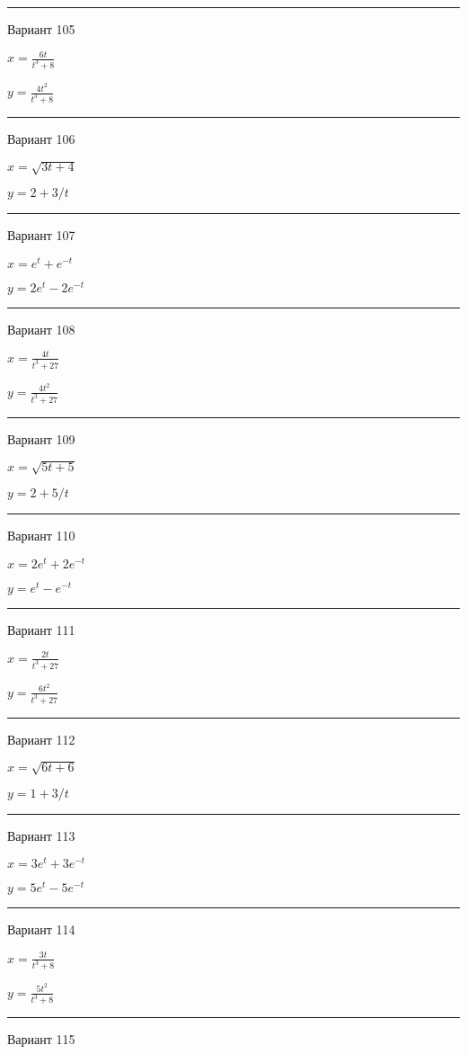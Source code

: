 \documentclass[11pt]{report}
\begin{document}
\rule{\textwidth}{.2mm}

 Вариант 105

$x = \frac{6 t}{t^{3} + 8}$

$y = \frac{4 t^{2}}{t^{3} + 8}$

\rule{\textwidth}{.2mm}

 Вариант 106

$x = \sqrt{3 t + 4}$

$y = 2 + 3 / t$

\rule{\textwidth}{.2mm}

 Вариант 107

$x = e^{t} + e^{- t}$

$y = 2 e^{t} - 2 e^{- t}$

\rule{\textwidth}{.2mm}

 Вариант 108

$x = \frac{4 t}{t^{3} + 27}$

$y = \frac{4 t^{2}}{t^{3} + 27}$

\rule{\textwidth}{.2mm}

 Вариант 109

$x = \sqrt{5 t + 5}$

$y = 2 + 5 / t$

\rule{\textwidth}{.2mm}

 Вариант 110

$x = 2 e^{t} + 2 e^{- t}$

$y = e^{t} - e^{- t}$

\rule{\textwidth}{.2mm}

 Вариант 111

$x = \frac{2 t}{t^{3} + 27}$

$y = \frac{6 t^{2}}{t^{3} + 27}$

\rule{\textwidth}{.2mm}

 Вариант 112

$x = \sqrt{6 t + 6}$

$y = 1 + 3 / t$

\rule{\textwidth}{.2mm}

 Вариант 113

$x = 3 e^{t} + 3 e^{- t}$

$y = 5 e^{t} - 5 e^{- t}$

\rule{\textwidth}{.2mm}

 Вариант 114

$x = \frac{3 t}{t^{3} + 8}$

$y = \frac{5 t^{2}}{t^{3} + 8}$

\rule{\textwidth}{.2mm}

 Вариант 115
\end{document}
